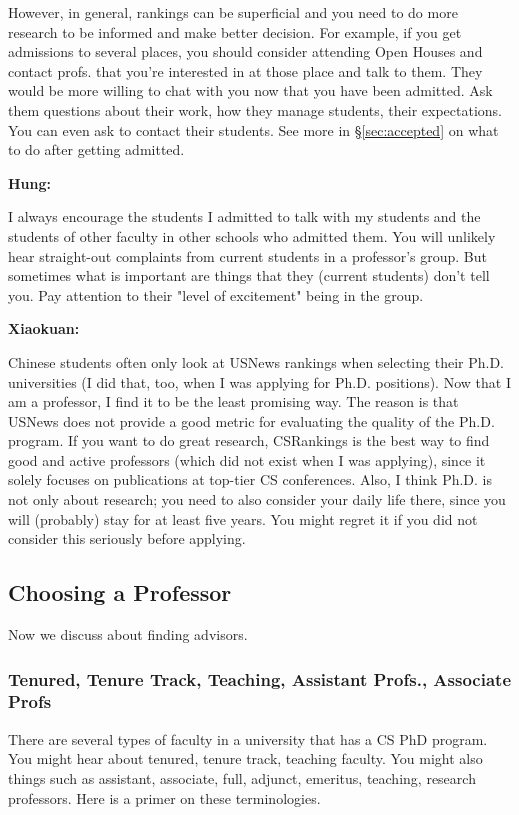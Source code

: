 \documentclass[11pt]{article}
\newenvironment{commentbox}[1][]{
\small
    \begin{cbox}
    \textbf{#1} 
 }{
   \end{cbox}
}
\begin{document}
However, in general, rankings can be superficial and you need to do more research to be informed and make better decision. For example, if you get admissions to several places, you should consider attending Open Houses and contact profs. that you're interested in at those place and talk to them. They would be more willing to chat with you now that you have been admitted.  Ask them questions about their work, how they manage students, their expectations. You can even ask to contact their students. See more in \S\ref{sec:accepted} on what to do after getting admitted.


\begin{commentbox}[Hung:]
I always encourage the students I admitted to talk with my students and the students of other faculty in other schools who admitted them. You will unlikely hear straight-out complaints from current students in a professor’s group. But sometimes what is important are things that they (current students) don’t tell you. Pay attention to their "level of excitement" being in the group.
\end{commentbox}

\begin{commentbox}[Xiaokuan:]
Chinese students often only look at USNews rankings when selecting their Ph.D. universities (I did that, too, when I was applying for Ph.D. positions).
Now that I am a professor, I find it to be the least promising way.
%
The reason is that USNews does not provide a good metric for evaluating the quality of the Ph.D. program.
%
If you want to do great research, CSRankings is the best way to find good and active professors (which did not exist when I was applying),
since it solely focuses on publications at top-tier CS conferences.
%
Also, 
I think Ph.D. is not only about research; 
you need to also consider your daily life there, since you will (probably) stay for at least five years.
%
You might regret it if you did not consider this seriously before applying.
%
\end{commentbox}


\subsection{Choosing a Professor}

Now we discuss about finding advisors.

\subsubsection{Tenured, Tenure Track, Teaching,  Assistant Profs., Associate Profs}
There are several types of faculty in a university that has a CS PhD program.  You might hear about tenured,  tenure track, teaching faculty.  You might also things such as assistant, associate, full, adjunct, emeritus, teaching, research professors. Here is a primer on these terminologies.
\end{document}
